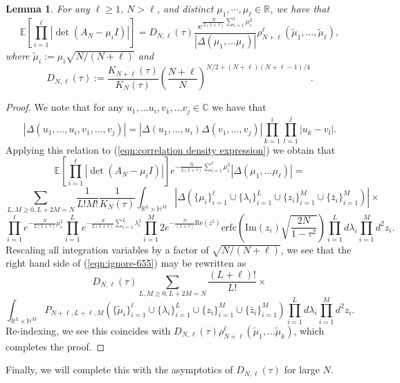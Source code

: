 \documentclass[12pt]{article}
\newcommand{\R}{\mathbb{R}}
\newcommand{\C}{\mathbb{C}}
\newcommand{\E}{\mathbb{E}}
\newtheorem{lem}[info]{Lemma}
\numberwithin{info}{section}
\numberwithin{equation}{section}
\renewcommand{\[}{\begin{equation}}
\renewcommand{\]}{\end{equation}}
\newcommand{\lam}{\lambda}
\newcommand{\sq}{\sqrt}
\newcommand{\<}{\langle}
\renewcommand{\>}{\rangle}
\renewcommand{\sq}{\sqrt}
\renewcommand{\Im}{\mathrm{Im}}
\renewcommand{\Re}{\mathrm{Re}}
\renewcommand{\Im}{\mathrm{Im}}
\renewcommand{\Re}{\mathrm{Re}}
\newcommand{\erfc}{\mathrm{erfc}}
\renewcommand{\l}{\left}
\renewcommand{\r}{\right}
\begin{document}
	\begin{lem}
		\label{lem:tuca-relation}
		For any $\ell\ge 1$, $N>\ell$, and distinct $\mu_1,\cdots,\mu_{\ell}\in \R$, we have that
		\[\E\left[\prod_{i=1}^{\ell}|\det(A_N-\mu_iI)|\right]=D_{N,\ell}(\tau)\frac{e^{\frac{N}{2(1+\tau)}\sum_{i=1}^{\ell}\mu_i^2}}{|\Delta(\mu_1,\dots \mu_\ell)|}\rho_{N+\ell}^{\ell}(\tilde{\mu}_1,\dots,\tilde{\mu}_\ell),\label{eqn:lem:tuca-relation}\]
		where $\tilde{\mu}_i:=\mu_i\sq{N/(N+\ell)}$ and 
		\[D_{N,\ell}(\tau):=\frac{K_{N+\ell}(\tau)}{K_N(\tau)}\left(\frac{N+\ell}{N}\right)^{N/2+(N+\ell)(N+\ell-1)/4}.\]
	\end{lem}
	\begin{proof}
		We note that for any $u_1,\dots u_i,v_1,\dots v_j\in \C$ we have that
		\[|\Delta(u_1,\dots, u_i,v_1,\dots, v_j)|=|\Delta(u_1,\dots, u_i)\Delta(v_1,\dots, v_j)|\prod_{k=1}^i\prod_{l=1}^{j}\l|u_k-v_l\r|.\]
		Applying this relation to (\ref{eqn:correlation density expression}) we obtain that
		\[\E\left[\prod_{i=1}^{\ell}|\det(A_N-\mu_i I)|\right]e^{-\frac{N}{2(1+\tau)}\sum_{i=1}^{\ell}\mu_i^2}|\Delta(\mu_1,\dots \mu_\ell)|=\]
		\[\sum_{L,M\ge 0, L+2M=N}\frac{1}{L!M!}\frac{1}{K_N(\tau)}\int_{\R^L\times \mathbb{H}^M}|\Delta(\{\mu_i\}_{i=1}^{\ell}\cup\{\lam_i\}_{i=1}^{L}\cup\{z_i\}_{i=1}^{M}\cup\{\bar{z}_i\}_{i=1}^{M})|\times\]
		\[\prod_{i=1}^{\ell}e^{-\frac{N}{2(1+\tau)}\mu_i^2}\prod_{i=1}^{L}e^{-\frac{N}{2(1+\tau)}\sum_{i=1}^{L}\lam_i^2}\prod_{i=1}^{M}2e^{-\frac{N}{(1+\tau)}\Re(z^2)}\erfc \left(\Im(z_i)\sq{\frac{2N}{1-\tau^2}} \right)\prod_{i=1}^{L}d\lam_i\prod_{i=1}^{M}d^2 z_i.\label{eqn:ignore-655}\]
		Rescaling all integration variables by a factor of $\sq{N/(N+\ell)}$, we see that the right hand side of (\ref{eqn:ignore-655}) may be rewritten as
		\[D_{N,\ell}(\tau)\sum_{L,M\ge 0, L+2M=N}\frac{(L+\ell)!}{L!}\times\]
		\[\int_{\R^L\times \mathbb{H}^M}P_{N+\ell,L+\ell,M}(\{\tilde{\mu}_i\}_{i=1}^{\ell}\cup\{\lam_i\}_{i=1}^{L}\cup\{z_i\}_{i=1}^{M}\cup\{\bar{z}_i\}_{i=1}^{M})\prod_{i=1}^{L}d\lam_i\prod_{i=1}^{M}d^2 z_i.\]
		Re-indexing, we see this coincides with $D_{N,\ell}(\tau)\rho^{\ell}_{N+\ell}(\tilde{\mu}_1,\dots \tilde{\mu}_k)$, which completes the proof.
	\end{proof}
	
	Finally, we will complete this with the asymptotics of $D_{N,\ell}(\tau)$ for large $N$.
	
\end{document}
